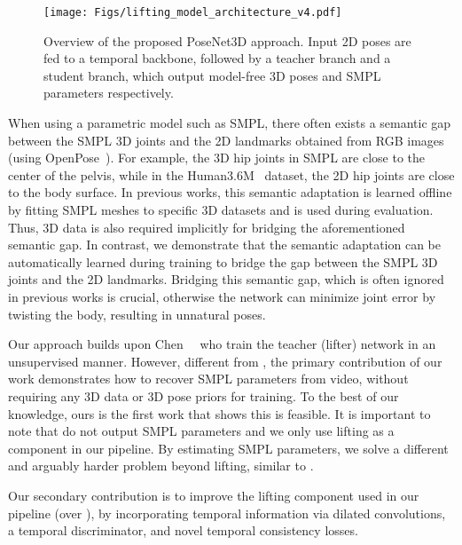 \documentclass[10pt,twocolumn,letterpaper]{article}
\begin{document}
\begin{figure*}[tb!]
	\centering
	\texttt{[image: Figs/lifting\_model\_architecture\_v4.pdf]}
	\vspace{-2ex}
	\caption{Overview of the proposed PoseNet3D approach. Input 2D poses are fed to a temporal backbone, followed by a teacher branch and a student branch, which output model-free 3D poses and SMPL parameters respectively.}
	\label{fig:overview}
	\vspace{-4ex}
\end{figure*}



When using a parametric model such as SMPL, there often exists a semantic gap between the SMPL 3D joints and the 2D landmarks obtained from RGB images (\eg using OpenPose~\cite{OpenPose}). For example, the 3D hip joints in SMPL are close to the center of the pelvis, while in the Human3.6M~\cite{h36m} dataset, the 2D hip joints are close to the body surface. In previous works, this semantic adaptation is learned {offline} by fitting SMPL meshes to specific 3D datasets and is used during evaluation. Thus, 3D data is also required implicitly for bridging the aforementioned semantic gap. In contrast, we demonstrate that the semantic adaptation can be automatically learned during training to bridge the gap between the SMPL 3D joints and the 2D landmarks. Bridging this semantic gap, which is often ignored in previous works is crucial, otherwise the network can minimize joint error by twisting the body, resulting in unnatural poses. 

Our approach builds upon Chen~\etal~\cite{chingCVPR2019} who train the teacher (lifter) network in an unsupervised manner. However, different from \cite{chingCVPR2019}, the primary contribution of our work demonstrates how to recover SMPL parameters from video, without requiring any 3D data or 3D pose priors for training. To the best of our knowledge, ours is the first work that shows this is feasible. It is important to note that \cite{chingCVPR2019} do not output SMPL parameters and we only use lifting as a component in our pipeline. By estimating SMPL parameters, we solve a different and arguably harder problem beyond lifting, similar to \cite{kanazawa2018end,SPIN_ICCV2019}. 

Our secondary contribution is to improve the lifting component used in our pipeline (over \cite{chingCVPR2019}), by incorporating temporal information via dilated convolutions, a temporal discriminator, and novel temporal consistency losses. 
\end{document}
